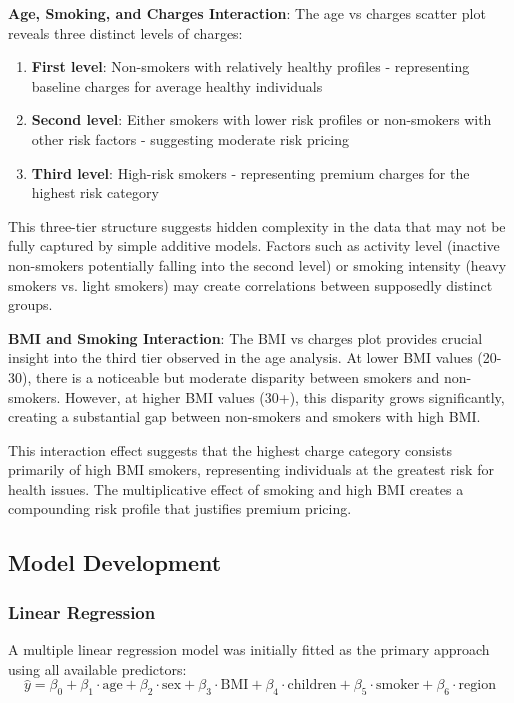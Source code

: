 \documentclass[12pt,a4paper]{article}
\begin{document}
\textbf{Age, Smoking, and Charges Interaction}:
The age vs charges scatter plot reveals three distinct levels of charges:
\begin{enumerate}
    \item \textbf{First level}: Non-smokers with relatively healthy profiles - representing baseline charges for average healthy individuals
    \item \textbf{Second level}: Either smokers with lower risk profiles or non-smokers with other risk factors - suggesting moderate risk pricing
    \item \textbf{Third level}: High-risk smokers - representing premium charges for the highest risk category
\end{enumerate}

This three-tier structure suggests hidden complexity in the data that may not be fully captured by simple additive models. Factors such as activity level (inactive non-smokers potentially falling into the second level) or smoking intensity (heavy smokers vs. light smokers) may create correlations between supposedly distinct groups.

\textbf{BMI and Smoking Interaction}:
The BMI vs charges plot provides crucial insight into the third tier observed in the age analysis. At lower BMI values (20-30), there is a noticeable but moderate disparity between smokers and non-smokers. However, at higher BMI values (30+), this disparity grows significantly, creating a substantial gap between non-smokers and smokers with high BMI.

This interaction effect suggests that the highest charge category consists primarily of high BMI smokers, representing individuals at the greatest risk for health issues. The multiplicative effect of smoking and high BMI creates a compounding risk profile that justifies premium pricing.

\subsection{Model Development}

\subsubsection{Linear Regression}
A multiple linear regression model was initially fitted as the primary approach using all available predictors:
$$\hat{y} = \beta_0 + \beta_1 \cdot \text{age} + \beta_2 \cdot \text{sex} + \beta_3 \cdot \text{BMI} + \beta_4 \cdot \text{children} + \beta_5 \cdot \text{smoker} + \beta_6 \cdot \text{region}$$
\end{document}
